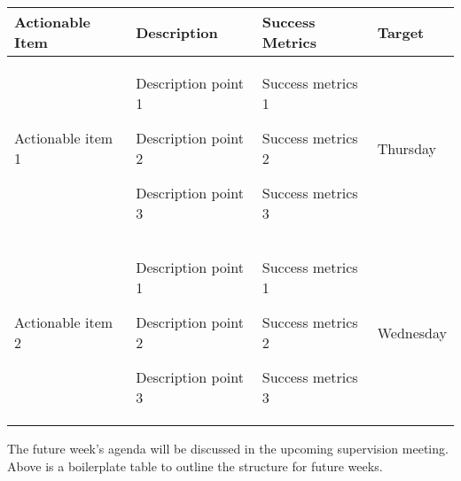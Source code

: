 \begin{table}[!h]
    \centering
    \begin{tabularx}{\textwidth}{|X|X|X|l|}
        \hline
        Actionable Item & Description & Success Metrics & Target \\
        \hline
        \hline
        Actionable item 1 &
        \begin{myitemize}
            \item Description point 1
            \item Description point 2
            \item Description point 3
        \end{myitemize} &
        \begin{myitemize}
            \item Success metrics 1
            \item Success metrics 2
            \item Success metrics 3
        \end{myitemize} &
        Thursday \\
        \hline
        Actionable item 2 &
        \begin{myitemize}
            \item Description point 1
            \item Description point 2
            \item Description point 3
        \end{myitemize} &
        \begin{myitemize}
            \item Success metrics 1
            \item Success metrics 2
            \item Success metrics 3
        \end{myitemize} &
        Wednesday \\
        \hline
    \end{tabularx}
\end{table}

The future week's agenda will be discussed in the upcoming supervision meeting. Above is a boilerplate table to outline the structure for future weeks.